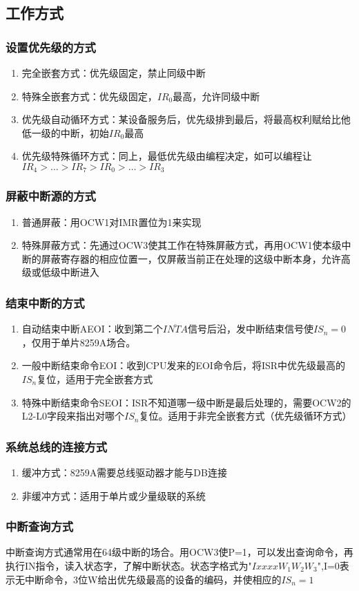 \subsection{工作方式}
\subsubsection{设置优先级的方式}
\begin{enumerate}
    \item 完全嵌套方式：优先级固定，禁止同级中断
    \item 特殊全嵌套方式：优先级固定，$IR_0$最高，允许同级中断
    \item 优先级自动循环方式：某设备服务后，优先级排到最后，将最高权利赋给比他低一级的中断，初始$IR_0$最高
    \item 优先级特殊循环方式：同上，最低优先级由编程决定，如可以编程让$IR_4>\dots>IR_7>IR_0>\dots>IR_3$
\end{enumerate}
\subsubsection{屏蔽中断源的方式}
\begin{enumerate}
    \item 普通屏蔽：用OCW1对IMR置位为1来实现
    \item 特殊屏蔽方式：先通过OCW3使其工作在特殊屏蔽方式，再用OCW1使本级中断的屏蔽寄存器的相应位置一，仅屏蔽当前正在处理的这级中断本身，允许高级或低级中断进入
\end{enumerate}
\subsubsection{结束中断的方式}
\begin{enumerate}
    \item 自动结束中断AEOI：收到第二个$\overline{INTA}$信号后沿，发中断结束信号使$IS_n=0$，仅用于单片8259A场合。
    \item 一般中断结束命令EOI：收到CPU发来的EOI命令后，将ISR中优先级最高的$IS_n$复位，适用于完全嵌套方式
    \item 特殊中断结束命令SEOI：ISR不知道哪一级中断是最后处理的，需要OCW2的L2-L0字段来指出对哪个$IS_n$复位。适用于非完全嵌套方式（优先级循环方式）
\end{enumerate}
\subsubsection{系统总线的连接方式}
\begin{enumerate}
    \item 缓冲方式：8259A需要总线驱动器才能与DB连接
    \item 非缓冲方式：适用于单片或少量级联的系统
\end{enumerate}
\subsubsection{中断查询方式}
中断查询方式通常用在64级中断的场合。用OCW3使P=1，可以发出查询命令，再执行IN指令，读入状态字，了解中断状态。状态字格式为"$IxxxxW_1W_2W_3$",I=0表示无中断命令，3位W给出优先级最高的设备的编码，并使相应的$IS_n=1$